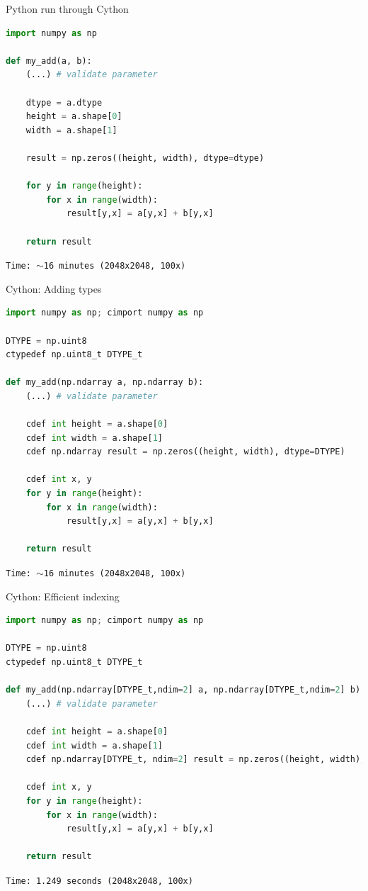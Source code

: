 \documentclass[dvipsnames]{beamer}
\begin{document}
\begin{frame}[fragile]{Python run through Cython}
\begin{lstlisting}[language=Python,caption={add2.pyx}]
import numpy as np

def my_add(a, b):
    (...) # validate parameter
	
    dtype = a.dtype
    height = a.shape[0]
    width = a.shape[1]

    result = np.zeros((height, width), dtype=dtype)

    for y in range(height):
        for x in range(width):
            result[y,x] = a[y,x] + b[y,x]

    return result
\end{lstlisting}
\pause
{\tt Time: $\sim$16 minutes (2048x2048, 100x)}
\end{frame}

\begin{frame}[fragile]{Cython: Adding types}

\begin{lstlisting}[language=Python,caption={add3.pyx}]
import numpy as np; cimport numpy as np

DTYPE = np.uint8
ctypedef np.uint8_t DTYPE_t

def my_add(np.ndarray a, np.ndarray b):
    (...) # validate parameter

    cdef int height = a.shape[0]
    cdef int width = a.shape[1]
    cdef np.ndarray result = np.zeros((height, width), dtype=DTYPE)

    cdef int x, y
    for y in range(height):
        for x in range(width):
            result[y,x] = a[y,x] + b[y,x]

    return result
\end{lstlisting}
\pause
\vspace{-0.2cm}
{\tt Time: $\sim$16 minutes (2048x2048, 100x)}
\end{frame}

\begin{frame}[fragile]{Cython: Efficient indexing}
\begin{lstlisting}[language=Python,caption={add4.pyx}]
import numpy as np; cimport numpy as np

DTYPE = np.uint8
ctypedef np.uint8_t DTYPE_t

def my_add(np.ndarray[DTYPE_t,ndim=2] a, np.ndarray[DTYPE_t,ndim=2] b):
    (...) # validate parameter

    cdef int height = a.shape[0]
    cdef int width = a.shape[1]
    cdef np.ndarray[DTYPE_t, ndim=2] result = np.zeros((height, width), dtype=DTYPE)

    cdef int x, y
    for y in range(height):
        for x in range(width):
            result[y,x] = a[y,x] + b[y,x]

    return result
\end{lstlisting}
\pause
\vspace{-0.2cm}
{\tt Time: 1.249 seconds (2048x2048, 100x)}
\end{frame}
\end{document}
